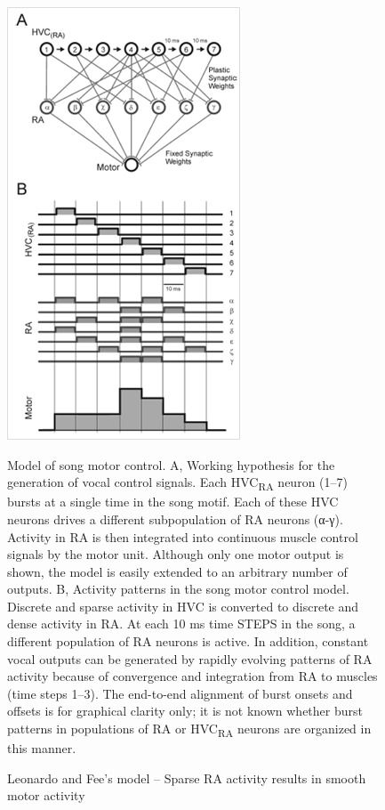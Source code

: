\documentclass[draft,12pt,oneside]{CUNY_PhD}
\begin{document}
\begin{figure}[h!]
\centering
\includegraphics[scale=0.4,center]{Long}
\caption{Leonardo and Fee’s model – Sparse RA activity results in smooth motor activity \cite{4}}\label{Fig 3}
Model of song motor control. A, Working hypothesis for the generation of vocal
control signals. Each HVC\textsubscript{RA} neuron (1–7) bursts at a single time in the song motif. Each of these HVC neurons drives a different subpopulation of RA neurons (α-γ). Activity in RA is then integrated into continuous muscle control signals by the motor unit. Although only one motor output is shown, the model is easily extended to an arbitrary number of outputs. B, Activity patterns in the song motor control model. Discrete and sparse activity in HVC is converted to discrete and dense activity in RA. At each 10 ms time STEPS in the song, a different population of RA neurons is active. In addition, constant vocal outputs can be generated by rapidly evolving patterns of RA activity because of convergence and integration from RA to muscles (time steps 1–3). The end-to-end alignment of burst onsets and offsets is for graphical clarity only; it is not known whether burst patterns in populations of RA or HVC\textsubscript{RA} neurons are organized in this manner.
\end{figure}
\end{document}

